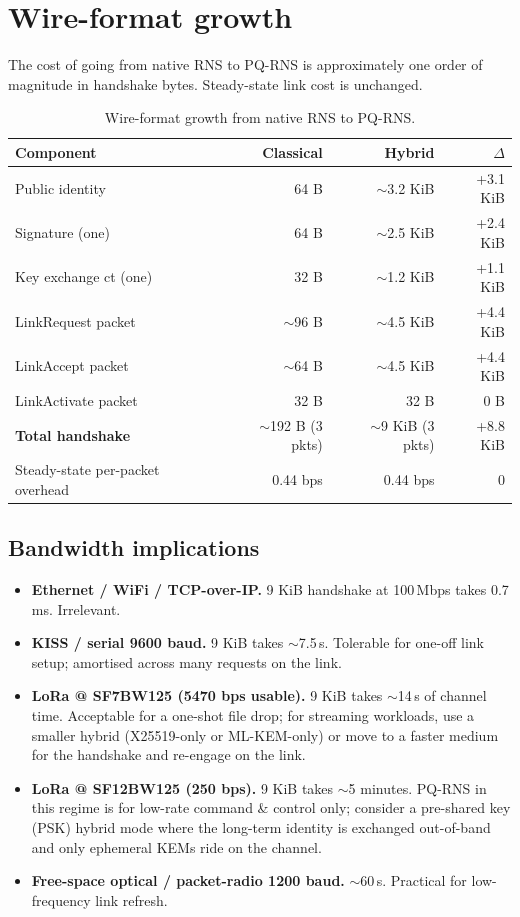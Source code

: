 \documentclass[11pt,a4paper]{article}
\begin{document}
\section{Wire-format growth}
\label{sec:size}

The cost of going from native RNS to PQ-RNS is approximately one
order of magnitude in handshake bytes. Steady-state link cost is
unchanged.

\begin{table}[H]
\centering
\small
\begin{tabular}{l r r r}
\toprule
\textbf{Component} & \textbf{Classical} & \textbf{Hybrid} & \textbf{$\Delta$} \\
\midrule
Public identity & 64 B & $\sim$3.2 KiB & +3.1 KiB \\
Signature (one) & 64 B & $\sim$2.5 KiB & +2.4 KiB \\
Key exchange ct (one) & 32 B & $\sim$1.2 KiB & +1.1 KiB \\
LinkRequest packet & $\sim$96 B & $\sim$4.5 KiB & +4.4 KiB \\
LinkAccept packet & $\sim$64 B & $\sim$4.5 KiB & +4.4 KiB \\
LinkActivate packet & 32 B & 32 B & 0 B \\
\midrule
\textbf{Total handshake} & $\sim$192 B (3 pkts) & $\sim$9 KiB (3 pkts) & +8.8 KiB \\
Steady-state per-packet overhead & 0.44 bps & 0.44 bps & 0 \\
\bottomrule
\end{tabular}
\caption{Wire-format growth from native RNS to PQ-RNS.}
\end{table}

\subsection{Bandwidth implications}

\begin{itemize}[leftmargin=*,itemsep=0pt]
\item \textbf{Ethernet / WiFi / TCP-over-IP.} 9 KiB handshake at
  100\,Mbps takes 0.7\,ms. Irrelevant.
\item \textbf{KISS / serial 9600 baud.} 9 KiB takes $\sim$7.5\,s.
  Tolerable for one-off link setup; amortised across many requests
  on the link.
\item \textbf{LoRa @ SF7BW125 (5470 bps usable).} 9 KiB takes
  $\sim$14\,s of channel time. Acceptable for a one-shot file drop;
  for streaming workloads, use a smaller hybrid (X25519-only or
  ML-KEM-only) or move to a faster medium for the handshake and
  re-engage on the link.
\item \textbf{LoRa @ SF12BW125 (250 bps).} 9 KiB takes
  $\sim$5 minutes. PQ-RNS in this regime is for low-rate command \&
  control only; consider a pre-shared key (PSK) hybrid mode where
  the long-term identity is exchanged out-of-band and only ephemeral
  KEMs ride on the channel.
\item \textbf{Free-space optical / packet-radio 1200 baud.}
  $\sim$60\,s. Practical for low-frequency link refresh.
\end{itemize}
\end{document}
